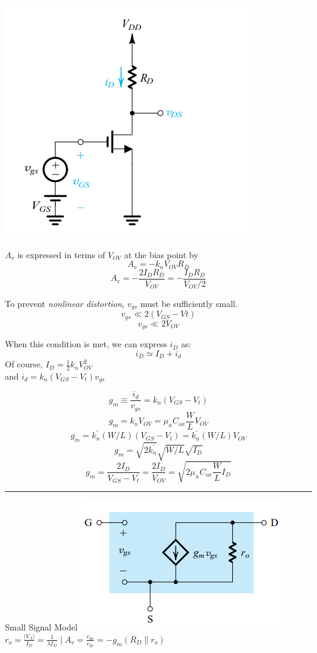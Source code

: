 \documentclass[a4paper]{article}
\begin{document}
\begin{multicols}{3}
\includegraphics[width=\linewidth]{imgs/nmos_as_amp1.png}

$A_v$ is expressed in terms of $V_{OV}$ at the bias point by
$$A_v=-k_n V_{OV} R_D$$
$$A_v=-\frac{2 I_D R_D}{V_{OV}}=-\frac{I_D R_D}{V_{OV}/2}$$

To prevent \emph{nonlinear distortion}, $v_{gs}$ must be sufficiently
small.
$$v_{gs} \ll 2(V_{GS} - V{t})$$
$$v_{gs} \ll 2V_{OV}$$

When this condition is met, we can express $i_D$ as:
$$i_D \simeq I_D + i_d$$
Of course, $I_D=\frac{1}{2}k_n V_{OV}^2$\\
and $i_d=k_n(V_{GS}-V_t)v_{gs}$

$$g_m \equiv \frac{i_d}{v_{gs}} = k_n(V_{GS}-V_t)$$
$$g_m = k_n V_{OV}=\mu_n C_{ox} \frac{W}{L} V_{OV}$$
$$g_m = k_n^{'}(W/L)(V_{GS}-V_t)=k_n^{'}(W/L)V_{OV}$$
$$g_m = \sqrt{2k_n^{'}}\sqrt{W/L}\sqrt{I_D}$$
$$g_m = \frac{2I_D}{V_{GS}-V_t}=\frac{2I_D}{V_{OV}}=\sqrt{2\mu_n C_{ox} \frac{W}{L} I_D}$$

\hrule
\vspace{1mm}
Small Signal Model
\includegraphics[width=\linewidth]{imgs/small_signal_model}
$r_o=\frac{|V_A|}{I_D}=\frac{1}{\lambda I_D} \mid A_v=\frac{v_{ds}}{v_{gs}}=-g_m(R_D\parallel r_o)$


\end{multicols}
\end{document}
